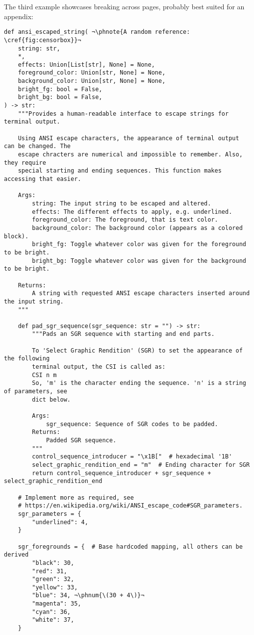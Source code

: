 The third example showcases breaking across pages, probably best suited for an appendix:
\begin{verbatim}
def ansi_escaped_string( ¬\phnote{A random reference: \cref{fig:censorbox}}¬
    string: str,
    *,
    effects: Union[List[str], None] = None,
    foreground_color: Union[str, None] = None,
    background_color: Union[str, None] = None,
    bright_fg: bool = False,
    bright_bg: bool = False,
) -> str:
    """Provides a human-readable interface to escape strings for terminal output.

    Using ANSI escape characters, the appearance of terminal output can be changed. The
    escape chracters are numerical and impossible to remember. Also, they require
    special starting and ending sequences. This function makes accessing that easier.

    Args:
        string: The input string to be escaped and altered.
        effects: The different effects to apply, e.g. underlined.
        foreground_color: The foreground, that is text color.
        background_color: The background color (appears as a colored block).
        bright_fg: Toggle whatever color was given for the foreground to be bright.
        bright_bg: Toggle whatever color was given for the background to be bright.

    Returns:
        A string with requested ANSI escape characters inserted around the input string.
    """

    def pad_sgr_sequence(sgr_sequence: str = "") -> str:
        """Pads an SGR sequence with starting and end parts.

        To 'Select Graphic Rendition' (SGR) to set the appearance of the following
        terminal output, the CSI is called as:
        CSI n m
        So, 'm' is the character ending the sequence. 'n' is a string of parameters, see
        dict below.

        Args:
            sgr_sequence: Sequence of SGR codes to be padded.
        Returns:
            Padded SGR sequence.
        """
        control_sequence_introducer = "\x1B["  # hexadecimal '1B'
        select_graphic_rendition_end = "m"  # Ending character for SGR
        return control_sequence_introducer + sgr_sequence + select_graphic_rendition_end

    # Implement more as required, see
    # https://en.wikipedia.org/wiki/ANSI_escape_code#SGR_parameters.
    sgr_parameters = {
        "underlined": 4,
    }

    sgr_foregrounds = {  # Base hardcoded mapping, all others can be derived
        "black": 30,
        "red": 31,
        "green": 32,
        "yellow": 33,
        "blue": 34, ¬\phnum{\(30 + 4\)}¬
        "magenta": 35,
        "cyan": 36,
        "white": 37,
    }


\end{verbatim}
